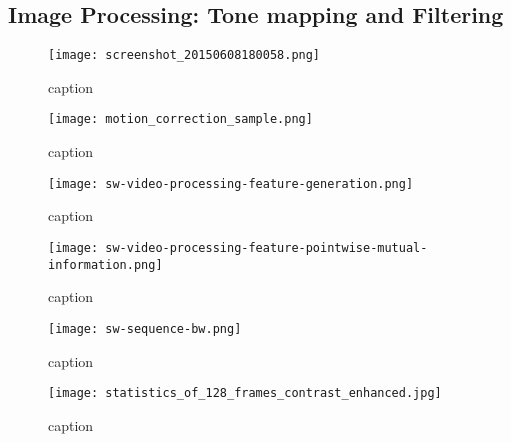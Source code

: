 \documentclass[../main.tex]{subfiles}
\begin{document}
\subsection{Image Processing: Tone mapping and
	Filtering}\label{image-processing-tonemapping-and-filtering}

\begin{figure}[htb]\centering
	\texttt{[image: screenshot\_20150608180058.png]}
	\caption{caption}
\end{figure}

\begin{figure}[htb]\centering
	\texttt{[image: motion\_correction\_sample.png]}
	\caption{caption}
\end{figure}

\begin{figure}[htb]\centering
	\texttt{[image: sw-video-processing-feature-generation.png]}
	\caption{caption}
\end{figure}


\begin{figure}[htb]\centering
	\texttt{[image: sw-video-processing-feature-pointwise-mutual-information.png]}
	\caption{caption}
\end{figure}

\begin{figure}[htb]\centering
	\texttt{[image: sw-sequence-bw.png]}
	\caption{caption}
\end{figure}


\begin{figure}[htb]\centering
	\texttt{[image: statistics\_of\_128\_frames\_contrast\_enhanced.jpg]}
	\caption{caption}
\end{figure}

\clearpage
\end{document}
